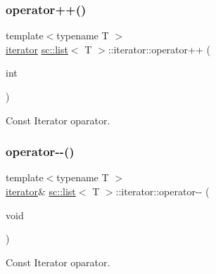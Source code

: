 \subsubsection{\texorpdfstring{operator++()}{operator++()}\hspace{0.1cm}{\footnotesize\ttfamily [2/2]}}
{\footnotesize\ttfamily template$<$typename T $>$ \\
\hyperlink{classsc_1_1list_1_1iterator}{iterator} \hyperlink{classsc_1_1list}{sc\+::list}$<$ T $>$\+::iterator\+::operator++ (\begin{DoxyParamCaption}\item[{int}]{ }\end{DoxyParamCaption})\hspace{0.3cm}{\ttfamily [inline]}}



Const Iterator oparator. 

\mbox{\label{classsc_1_1list_1_1iterator_ac12691e2087705b22bbd5fc5828cd39a}} 
\subsubsection{\texorpdfstring{operator-\/-\/()}{operator--()}\hspace{0.1cm}{\footnotesize\ttfamily [1/2]}}
{\footnotesize\ttfamily template$<$typename T $>$ \\
\hyperlink{classsc_1_1list_1_1iterator}{iterator}\& \hyperlink{classsc_1_1list}{sc\+::list}$<$ T $>$\+::iterator\+::operator-\/-\/ (\begin{DoxyParamCaption}\item[{void}]{ }\end{DoxyParamCaption})\hspace{0.3cm}{\ttfamily [inline]}}



Const Iterator oparator. 

\mbox{\label{classsc_1_1list_1_1iterator_ae5780db46cc0e71abd3b8be55daddded}} 
